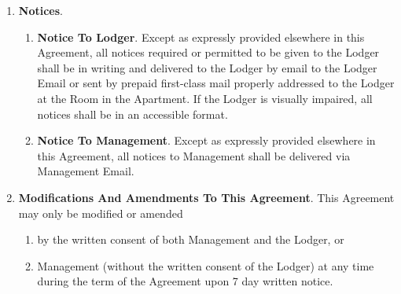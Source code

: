 \documentclass[12pt,letterpaper]{article}
\newcommand{\lodger}{Lodger}
\newcommand{\management}{Management}
\newcommand{\myemail}{Management Email}
\newcommand{\apt}{Apartment}
\newcommand{\room}{Room}
\newcommand{\lemail}{Lodger Email}
\begin{document}
\begin{enumerate}
\begin{enumerate}
					\begin{enumerate}
						\item Personally delivering a copy to the \lodger{}; or, 
						\item If the \lodger{} is absent from the \room{} and from his or her usual place of business, service may be made by leaving a copy with some person of suitable age and discretion at his or her usual place of business, and sending a copy through the mail addressed to the \lodger{} at \apt{}; or, 
						\item If such place of business cannot be ascertained, or a person of suitable age or discretion there cannot be found, then service may be made by affixing a copy in a conspicuous place in the \room{}, and also sending a copy through the mail addressed to the \lodger{} at \apt{}.
					\end{enumerate}
			\end{enumerate}
		\item \textbf{Notices}. 
			\begin{enumerate} 
				\item \textbf{Notice To \lodger{}}. 
					Except as expressly provided elsewhere in this Agreement, all notices required or permitted to be given to the \lodger{} shall be in writing and delivered to the \lodger{} by email to the \lemail{} or sent by prepaid first-class mail properly addressed to the \lodger{} at the \room{} in the \apt{}. If the \lodger{} is visually impaired, all notices shall be in an accessible format. 
				\item \textbf{Notice To Management}. 
					Except as expressly provided elsewhere in this Agreement, all notices to \management{} shall be delivered via \myemail{}.
			\end{enumerate}
		\item \textbf{Modifications And Amendments To This Agreement}. \label{modifications}
			This Agreement may only be modified or amended 
			\begin{enumerate}
				\item by the written consent of both \management{} and the \lodger{}, or 
				\item \management{} (without the written consent of the \lodger{}) at any time during the term of the Agreement upon 7 day written notice. 
			\end{enumerate}
					

\end{enumerate}
\end{document}
